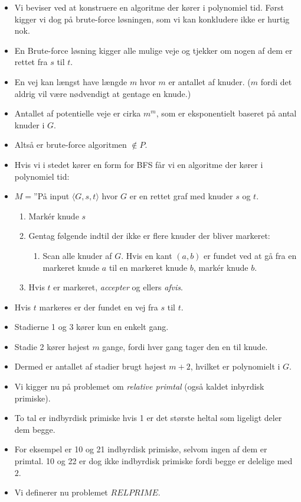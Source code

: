 \begin{frame}[allowframebreaks]
	\begin{itemize}
		\item Vi beviser ved at konstruere en algoritme der kører i polynomiel tid. Først kigger vi dog på brute-force løsningen, som vi kan konkludere ikke er hurtig nok.
		\item En Brute-force løsning kigger alle mulige veje og tjekker om nogen af dem er rettet fra $s$ til $t$.
		\item En vej kan længst have længde $m$ hvor $m$ er antallet af knuder. ($m$ fordi det aldrig vil være nødvendigt at gentage en knude.)
		\item Antallet af potentielle veje er cirka $m^{m}$, som er eksponentielt baseret på antal knuder i $G$.
		\item Altså er brute-force algoritmen $\notin P$.
		\item Hvis vi i stedet kører en form for BFS får vi en algoritme der kører i polynomiel tid:
		\item $M =$''På input \(\langle G, s, t \rangle \) hvor $G$ er en rettet graf med knuder $s$ og $t$.
		      \begin{enumerate}
			      \item Markér knude $s$
			      \item Gentag følgende indtil der ikke er flere knuder der bliver markeret:
			            \begin{enumerate}
				            \item Scan alle knuder af $G$. Hvis en kant $(a,b)$ er fundet ved at gå fra en markeret knude $a$ til en markeret knude $b$, markér knude $b$.
			            \end{enumerate}
			      \item Hvis $t$ er markeret, \textit{accepter} og ellers \textit{afvis}.
		      \end{enumerate}
		\item Hvis $t$ markeres er der fundet en vej fra $s$ til $t$.
		\item Stadierne 1 og 3 kører kun en enkelt gang.
		\item Stadie 2 kører højest $m$ gange, fordi hver gang tager den en til knude.
		\item Dermed er antallet af stadier brugt højest $m+2$, hvilket er polynomielt i $G$.
		\item Vi kigger nu på problemet om \textit{relative primtal} (også kaldet inbyrdisk primiske).
		\item To tal er indbyrdisk primiske hvis 1 er det største heltal som ligeligt deler dem begge.
		\item For eksempel er 10 og 21 indbyrdisk primiske, selvom ingen af dem er primtal. 10 og 22 er dog ikke indbyrdisk primiske fordi begge er delelige med $2$.
		\item Vi definerer nu problemet $RELPRIME$.
	\end{itemize}


\end{frame}
